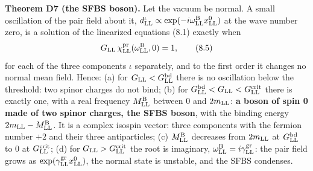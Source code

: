 \documentclass[
  10pt,
]{article}
\begin{document}
\textbf{Theorem D7 (the SFBS boson).} Let the vacuum be normal. A small
oscillation of the pair field about it,
\(d^\iota_{\rm LL}\propto\exp(-i\omega^{\rm B}_{\rm LL}x^0_{\rm LL})\)
at the wave number zero, is a solution of the linearized equations (8.1)
exactly when
\[G_{\rm LL}\,\chi^{\rm pr}_{\rm LL}(\omega^{\rm B}_{\rm LL},0)=1,\tag{8.5}\]
for each of the three components \(\iota\) separately, and to the first
order it changes no normal mean field. Hence: (a) for
\(G_{\rm LL}<G^{\rm bd}_{\rm LL}\) there is no oscillation below the
threshold: two spinor charges do not bind; (b) for
\(G^{\rm bd}_{\rm LL}<G_{\rm LL}<G^{\rm crit}_{\rm LL}\) there is
exactly one, with a real frequency \(M^{\rm B}_{\rm LL}\) between 0 and
\(2m_{\rm LL}\): \textbf{a boson of spin 0 made of two spinor charges,
the SFBS boson}, with the binding energy
\(2m_{\rm LL}-M^{\rm B}_{\rm LL}\). It is a complex isospin vector:
three components with the fermion number \(+2\) and their three
antiparticles; (c) \(M^{\rm B}_{\rm LL}\) decreases from \(2m_{\rm LL}\)
at \(G^{\rm bd}_{\rm LL}\) to 0 at \(G^{\rm crit}_{\rm LL}\); (d) for
\(G_{\rm LL}>G^{\rm crit}_{\rm LL}\) the root is imaginary,
\(\omega^{\rm B}_{\rm LL}=i\gamma^{\rm gr}_{\rm LL}\): the pair field
grows as \(\exp(\gamma^{\rm gr}_{\rm LL}x^0_{\rm LL})\), the normal
state is unstable, and the SFBS condenses.
\end{document}
